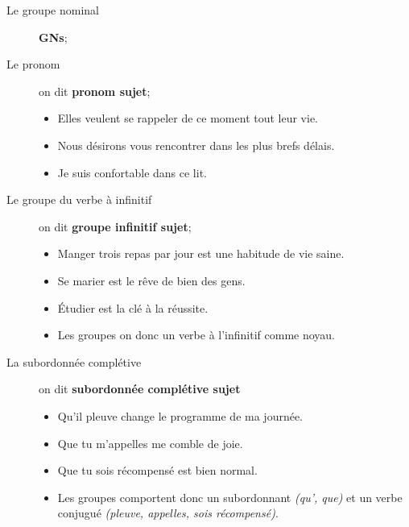 \documentclass[10pt, french]{article}
\begin{document}
\begin{multicols*}{2}
\begin{distributions}
\begin{description}
	\item[Le groupe nominal]	\textbf{GNs};
	\item[Le pronom]	on dit \textbf{pronom sujet};
		\begin{itemize}[leftmargin = *]
		\item	\textcolor{blue_rectangle}{Elles} veulent se rappeler de ce moment tout leur vie.
		\item	\textcolor{blue_rectangle}{Nous} désirons vous rencontrer dans les plus brefs délais.
		\item	\textcolor{blue_rectangle}{Je} suis confortable dans ce lit.
		\end{itemize}
	\item[Le groupe du verbe à infinitif]	on dit \textbf{groupe infinitif sujet};
		\begin{itemize}[leftmargin = *]
		\item	\textcolor{blue_rectangle}{Manger trois repas par jour} est une habitude de vie saine.
		\item	\textcolor{blue_rectangle}{Se marier} est le rêve de bien des gens.
		\item	\textcolor{blue_rectangle}{Étudier} est la clé à la réussite.
		\item	Les groupes on donc un verbe à l'infinitif comme noyau.
		\end{itemize}
	\item[La subordonnée complétive]	on dit \textbf{subordonnée complétive sujet}
		\begin{itemize}[leftmargin = *]
		\item	\textcolor{blue_rectangle}{Qu'il pleuve} change le programme de ma journée.
		\item	\textcolor{blue_rectangle}{Que tu m'appelles} me comble de joie.
		\item	\textcolor{blue_rectangle}{Que tu sois récompensé} est bien normal.
		\item	Les groupes comportent donc un subordonnant \textit{(qu', que)} et un verbe conjugué \textit{(pleuve, appelles, sois récompensé)}.
		\end{itemize}
\end{description}
\end{distributions}


\end{multicols*}
\end{document}
